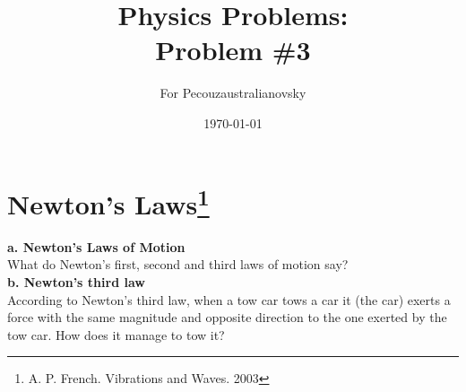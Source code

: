 \documentclass{article}
\begin{document}
\title{Physics Problems:\\ Problem \#3}

\author{For Pecouzaustralianovsky} %

\date{\today}
\maketitle


\section*{Newton's Laws\footnote{A. P. French. Vibrations and Waves. 2003}}

\textbf{a. Newton's Laws of Motion}\\

What do Newton's first, second and third laws of motion say?\\

\textbf{b. Newton's third law }\\

According to Newton's third law, when a tow car tows a car it (the car) exerts a force with the same magnitude and opposite direction to the one exerted by the tow car. How does it manage to tow it?
\end{document}
